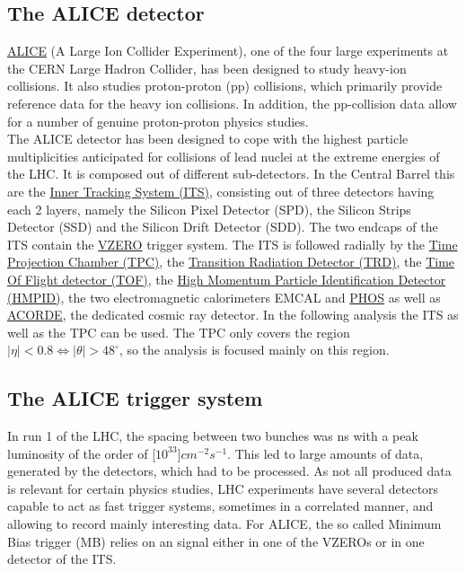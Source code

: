 \documentclass{article}
\begin{document}
\subsection{The ALICE detector}
\href{http://aliceinfo.cern.ch/}{ALICE} (A Large Ion Collider Experiment), one of the four large experiments at the CERN Large Hadron Collider, has been designed to study heavy-ion collisions. It also studies proton-proton (pp) collisions, which primarily provide reference data for the heavy ion collisions. In addition, the pp-collision data allow for a number of genuine proton-proton physics studies.\\
The ALICE detector has been designed to cope with the highest particle multiplicities anticipated for collisions of lead nuclei at the extreme energies of the LHC. It is composed out of different sub-detectors. In the Central Barrel this are 
the \href{http://alipub.web.cern.ch/content/inner-tracking-system}{Inner Tracking System (ITS)}, consisting out of three detectors having each 2 layers, namely the Silicon Pixel Detector (SPD), the Silicon Strips Detector (SSD) and the Silicon Drift Detector (SDD). The two endcaps of the ITS contain 
the \href{http://alipub.web.cern.ch/content/v0-detector}{VZERO} trigger system. The ITS is followed radially by
the \href{http://alipub.web.cern.ch/content/time-projection-chamber}{Time Projection Chamber (TPC)}, 
the \href{http://alipub.web.cern.ch/content/transition-radiation-detector}{Transition Radiation Detector (TRD)}, 
the \href{http://alipub.web.cern.ch/content/time-flight}{Time Of Flight detector (TOF)}, 
the \href{http://alipub.web.cern.ch/content/high-momentum-particle-identification-detector}{High Momentum Particle Identification Detector (HMPID)}, the two electromagnetic calorimeters 
EMCAL and 
\href{http://alipub.web.cern.ch/content/photon-spectrometer}{PHOS} as well as 
\href{http://alipub.web.cern.ch/content/alice-cosmic-ray-detector}{ACORDE}, the dedicated cosmic ray detector. In the following analysis the ITS as well as the TPC can be used. The TPC only covers the region $|\eta|<0.8 \Leftrightarrow |\theta|>48^{\circ}$, so the analysis is focused mainly on this region.

\subsection{The ALICE trigger system}
In run 1 of the LHC, the spacing between two bunches was \unit[50]{ns} with a peak luminosity of the order of \unit[$10^{33}$]{$cm^{-2} s^{-1}$}. This led to large amounts of data, generated by the detectors, which had to be processed. As not all produced data is relevant for certain physics studies,  LHC experiments have several detectors capable to act as fast trigger systems, sometimes in a correlated manner, and allowing to record mainly interesting data. For ALICE, the so called Minimum Bias trigger (MB) relies on an signal either in one of the VZEROs or in one detector of the ITS. 
\end{document}
